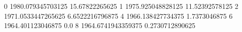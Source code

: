 0 1980.079345703125 15.67822265625
1 1975.925048828125 11.52392578125
2 1971.0533447265625 6.6522216796875
4 1966.138427734375 1.7373046875
6 1964.401123046875 0.0
8 1964.6741943359375 0.2730712890625
